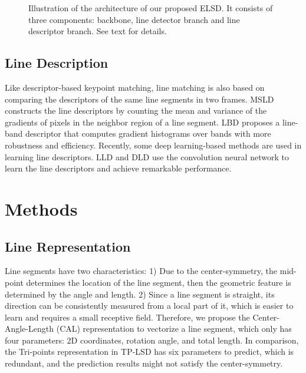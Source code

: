 \documentclass[10pt,twocolumn,letterpaper]{article}
\begin{document}
\begin{figure*}[t]
	\begin{center}
	\end{center}
	\caption{Illustration of the architecture of our proposed ELSD. It consists of three components: backbone, line detector branch and line descriptor branch. See text for details.}
	\label{framework}
\end{figure*}


\subsection{Line Description}
Like descriptor-based keypoint matching\cite{superpoint,SIFT,orb}, line matching is also based on comparing the descriptors of the same line segments in two frames. MSLD\cite{MSLD} constructs the line descriptors by counting the mean and variance of the gradients of pixels in the neighbor region of a line segment. LBD\cite{LBD} proposes a line-band descriptor that computes gradient histograms over bands with more robustness and efficiency. Recently, some deep learning-based methods are used in learning line descriptors. LLD\cite{LLD} and DLD\cite{DLD} use the convolution neural network to learn the line descriptors and achieve remarkable performance. 




\section{Methods}
\subsection{Line Representation}
Line segments have two characteristics: 1) Due to the center-symmetry, the mid-point determines the location of the line segment, then the geometric feature is determined by the angle and length. 2) Since a line segment is straight, its direction can be consistently measured from a local part of it, which is easier to learn and requires a small receptive field. Therefore, we propose the Center-Angle-Length (CAL) representation to vectorize a line segment, which only has four parameters: 2D coordinates, rotation angle, and total length. In comparison, the Tri-points representation in TP-LSD\cite{TP-LSD} has six parameters to predict, which is redundant, and the prediction results might not satisfy the center-symmetry.
\end{document}
